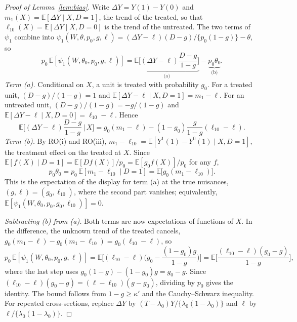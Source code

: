 \documentclass[11pt]{article}
\providecommand{\E}{\mathbb{E}}
\newenvironment{ins}{\begin{leftbar}}{\end{leftbar}}
\theoremstyle{plain}
\theoremstyle{remark}
\begin{document}
\begin{ins}
\begin{proof}[Proof of Lemma~\ref{lem:bias}]
Write $\Delta Y=Y(1)-Y(0)$ and $m_1(X)=\E[\Delta Y\mid X,D=1]$, the trend of the
treated, so that $\ell_{10}(X)=\E[\Delta Y\mid X,D=0]$ is the trend of the
untreated. The two terms of $\psi_1$ combine into
$\psi_1(W,\theta,p_0,g,\ell)=(\Delta Y-\ell)(D-g)/\{p_0(1-g)\}-\theta$, so
\begin{equation*}
  p_0\,\E[\psi_1(W,\theta_0,p_0,g,\ell)]
  =\underbrace{\E\Big[(\Delta Y-\ell)\frac{D-g}{1-g}\Big]}_{\text{(a)}}-\underbrace{p_0\theta_0}_{\text{(b)}} .
\end{equation*}
\emph{Term (a).} Conditional on $X$, a unit is treated with probability $g_0$.
For a treated unit, $(D-g)/(1-g)=1$ and $\E[\Delta Y-\ell\mid X,D=1]=m_1-\ell$.
For an untreated unit, $(D-g)/(1-g)=-g/(1-g)$ and
$\E[\Delta Y-\ell\mid X,D=0]=\ell_{10}-\ell$. Hence
\[
  \E\Big[(\Delta Y-\ell)\frac{D-g}{1-g}\,\Big|\,X\Big]
  =g_0(m_1-\ell)-(1-g_0)\frac{g}{1-g}(\ell_{10}-\ell).
\]
\emph{Term (b).} By RO(i) and RO(iii), $m_1-\ell_{10}=\E[Y^1(1)-Y^0(1)\mid X,D=1]$,
the treatment effect on the treated at $X$. Since
$\E[f(X)\mid D=1]=\E[Df(X)]/p_0=\E[g_0f(X)]/p_0$ for any $f$,
\[
  p_0\theta_0=p_0\,\E[m_1-\ell_{10}\mid D=1]=\E\big[g_0(m_1-\ell_{10})\big].
\]
This is the expectation of the display for term (a) at the true nuisances,
$(g,\ell)=(g_0,\ell_{10})$, where the second part vanishes; equivalently,
$\E[\psi_1(W,\theta_0,p_0,g_0,\ell_{10})]=0$.

\emph{Subtracting (b) from (a).} Both terms are now expectations of functions of
$X$. In the difference, the unknown trend of the treated cancels,
$g_0(m_1-\ell)-g_0(m_1-\ell_{10})=g_0(\ell_{10}-\ell)$, so
\[
  p_0\,\E[\psi_1(W,\theta_0,p_0,g,\ell)]
  =\E\Big[(\ell_{10}-\ell)\Big(g_0-\frac{(1-g_0)g}{1-g}\Big)\Big]
  =\E\Big[\frac{(\ell_{10}-\ell)(g_0-g)}{1-g}\Big],
\]
where the last step uses $g_0(1-g)-(1-g_0)g=g_0-g$. Since
$(\ell_{10}-\ell)(g_0-g)=(\ell-\ell_{10})(g-g_0)$, dividing by $p_0$ gives the
identity. The bound follows from $1-g\ge\kappa'$ and the Cauchy--Schwarz
inequality. For repeated cross-sections, replace $\Delta Y$ by
$(T-\lambda_0)Y/\{\lambda_0(1-\lambda_0)\}$ and $\ell$ by
$\ell/\{\lambda_0(1-\lambda_0)\}$.
\end{proof}
\end{ins}
\end{document}
